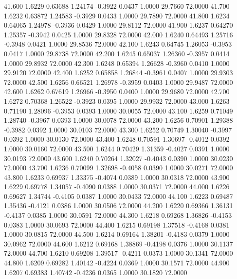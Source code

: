   41.600   1.6229   0.63688   1.24174  -0.3922   0.0437   1.0000  29.7660  72.0000
  41.700   1.6232   0.63872   1.24583  -0.3929   0.0433   1.0000  29.7890  72.0000
  41.800   1.6234   0.64065   1.24978  -0.3936   0.0429   1.0000  29.8112  72.0000
  41.900   1.6237   0.64270   1.25357  -0.3942   0.0425   1.0000  29.8328  72.0000
  42.000   1.6240   0.64493   1.25716  -0.3948   0.0421   1.0000  29.8536  72.0000
  42.100   1.6243   0.64745   1.26053  -0.3953   0.0417   1.0000  29.8738  72.0000
  42.200   1.6245   0.65037   1.26360  -0.3957   0.0414   1.0000  29.8932  72.0000
  42.300   1.6248   0.65394   1.26628  -0.3960   0.0410   1.0000  29.9120  72.0000
  42.400   1.6252   0.65858   1.26844  -0.3961   0.0407   1.0000  29.9303  72.0000
  42.500   1.6256   0.66521   1.26978  -0.3959   0.0403   1.0000  29.9487  72.0000
  42.600   1.6262   0.67619   1.26966  -0.3950   0.0400   1.0000  29.9680  72.0000
  42.700   1.6272   0.70368   1.26522  -0.3923   0.0395   1.0000  29.9932  72.0000
  43.000   1.6263   0.71190   1.28096  -0.3953   0.0393   1.0000  30.0055  72.0000
  43.100   1.6259   0.71049   1.28740  -0.3967   0.0393   1.0000  30.0078  72.0000
  43.200   1.6256   0.70901   1.29388  -0.3982   0.0392   1.0000  30.0103  72.0000
  43.300   1.6252   0.70749   1.30040  -0.3997   0.0392   1.0000  30.0130  72.0000
  43.400   1.6248   0.70591   1.30697  -0.4012   0.0392   1.0000  30.0160  72.0000
  43.500   1.6244   0.70429   1.31359  -0.4027   0.0391   1.0000  30.0193  72.0000
  43.600   1.6240   0.70264   1.32027  -0.4043   0.0390   1.0000  30.0230  72.0000
  43.700   1.6236   0.70099   1.32698  -0.4058   0.0390   1.0000  30.0271  72.0000
  43.800   1.6233   0.69937   1.33375  -0.4074   0.0389   1.0000  30.0318  72.0000
  43.900   1.6229   0.69778   1.34057  -0.4090   0.0388   1.0000  30.0371  72.0000
  44.000   1.6226   0.69627   1.34744  -0.4105   0.0387   1.0000  30.0433  72.0000
  44.100   1.6223   0.69487   1.35436  -0.4121   0.0386   1.0000  30.0506  72.0000
  44.200   1.6220   0.69366   1.36131  -0.4137   0.0385   1.0000  30.0591  72.0000
  44.300   1.6218   0.69268   1.36826  -0.4153   0.0383   1.0000  30.0693  72.0000
  44.400   1.6215   0.69198   1.37518  -0.4168   0.0381   1.0000  30.0815  72.0000
  44.500   1.6214   0.69164   1.38201  -0.4183   0.0379   1.0000  30.0962  72.0000
  44.600   1.6212   0.69168   1.38869  -0.4198   0.0376   1.0000  30.1137  72.0000
  44.700   1.6210   0.69208   1.39517  -0.4211   0.0373   1.0000  30.1341  72.0000
  44.800   1.6209   0.69282   1.40142  -0.4224   0.0369   1.0000  30.1571  72.0000
  44.900   1.6207   0.69383   1.40742  -0.4236   0.0365   1.0000  30.1820  72.0000
